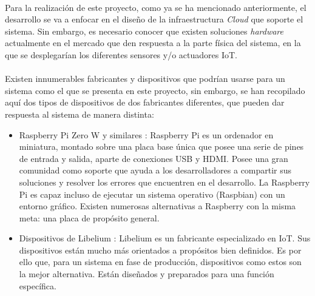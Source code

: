 \documentclass[../../memoria.tex]{subfiles}
\begin{document}
\paragraph{}
Para la realización de este proyecto, como ya se ha mencionado anteriormente, el desarrollo se va a enfocar en el diseño de la infraestructura \textit{Cloud} que soporte el sistema. Sin embargo, es necesario conocer que existen soluciones \textit{hardware} actualmente en el mercado que den respuesta a la parte física del sistema, en la que se desplegarían los diferentes sensores y/o actuadores IoT.

\paragraph{}
Existen innumerables fabricantes y dispositivos que podrían usarse para un sistema como el que se presenta en este proyecto, sin embargo, se han recopilado aquí dos tipos de dispositivos de dos fabricantes diferentes, que pueden dar respuesta al sistema de manera distinta:

\begin{itemize}

    \item Raspberry Pi Zero W y similares \cite{raspberry}: Raspberry Pi es un ordenador en miniatura, montado sobre una placa base única que posee una serie de pines de entrada y salida, aparte de conexiones USB y HDMI. Posee una gran comunidad como soporte que ayuda a los desarrolladores a compartir sus soluciones y resolver los errores que encuentren en el desarrollo. La Raspberry Pi es capaz incluso de ejecutar un sistema operativo (Raspbian) con un entorno gráfico. Existen numerosas alternativas a Raspberry con la misma meta: una placa de propósito general.

    \item Dispositivos de Libelium \cite{libelium}: Libelium es un fabricante especializado en IoT. Sus dispositivos están mucho más orientados a propósitos bien definidos. Es por ello que, para un sistema en fase de producción, dispositivos como estos son la mejor alternativa. Están diseñados y preparados para una función específica.
\end{itemize}
\end{document}
